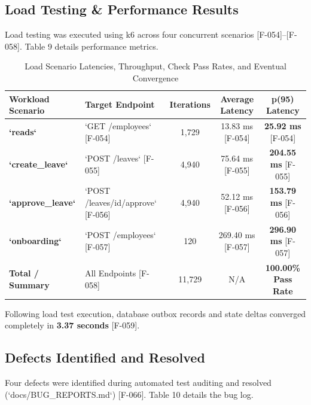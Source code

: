 \documentclass[11pt,a4paper]{article}
\begin{document}
\subsection{Load Testing \& Performance Results}
Load testing was executed using k6 across four concurrent scenarios [F-054]--[F-058]. Table 9 details performance metrics.

\begin{table}[htbp]
\caption{Load Scenario Latencies, Throughput, Check Pass Rates, and Eventual Convergence}
\centering
\begin{tabularx}{\linewidth}{l X c c c}
\toprule
\textbf{Workload Scenario} & \textbf{Target Endpoint} & \textbf{Iterations} & \textbf{Average Latency} & \textbf{p(95) Latency} \\
\midrule
\textbf{`reads`} & `GET /employees` [F-054] & 1,729 & 13.83 ms [F-054] & \textbf{25.92 ms} [F-054] \\
\textbf{`create\_leave`} & `POST /leaves` [F-055] & 4,940 & 75.64 ms [F-055] & \textbf{204.55 ms} [F-055] \\
\textbf{`approve\_leave`} & `POST /leaves/{id}/approve` [F-056] & 4,940 & 52.12 ms [F-056] & \textbf{153.79 ms} [F-056] \\
\textbf{`onboarding`} & `POST /employees` [F-057] & 120 & 269.40 ms [F-057] & \textbf{296.90 ms} [F-057] \\
\midrule
\textbf{Total / Summary} & All Endpoints [F-058] & 11,729 & N/A & \textbf{100.00\% Pass Rate} \\
\bottomrule
\end{tabularx}
\end{table}

Following load test execution, database outbox records and state deltas converged completely in \textbf{3.37 seconds} [F-059].

\subsection{Defects Identified and Resolved}
Four defects were identified during automated test auditing and resolved (`docs/BUG\_REPORTS.md`) [F-066]. Table 10 details the bug log.
\end{document}
